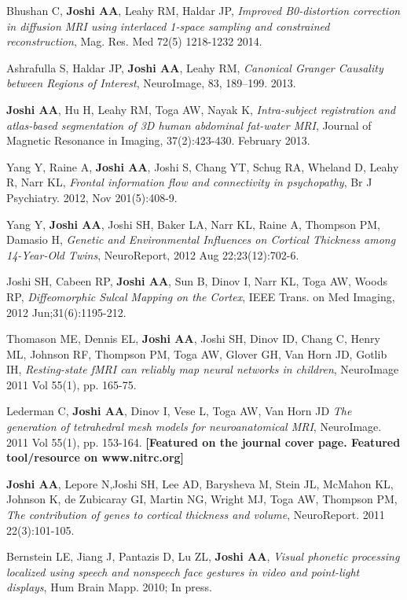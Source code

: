 \documentclass[overlapped,line,letterpaper]{res}
\begin{document}
\begin{resume}
Bhushan C, \textbf{Joshi AA}, Leahy RM, Haldar JP, \textit{Improved B0-distortion correction in diffusion MRI using interlaced 1-space sampling and constrained reconstruction}, Mag. Res. Med 72(5) 1218-1232 2014.

Ashrafulla S, Haldar JP, \textbf{Joshi AA}, Leahy RM, \textit{Canonical Granger Causality between Regions of Interest}, NeuroImage, 83, 189–199. 2013.

\textbf{Joshi AA}, Hu H, Leahy RM, Toga AW, Nayak K, \textit{Intra-subject registration and atlas-based segmentation of 3D human abdominal fat-water MRI}, Journal of Magnetic Resonance in Imaging,  37(2):423-430. February 2013.

Yang Y, Raine A, \textbf{Joshi AA}, Joshi S, Chang YT, Schug RA, Wheland D, Leahy R, Narr KL, \textit{Frontal information flow and connectivity in psychopathy}, Br J Psychiatry. 2012, Nov 201(5):408-9.

Yang Y, \textbf{Joshi AA}, Joshi SH, Baker LA, Narr KL, Raine A, Thompson PM, Damasio H, \textit{Genetic and Environmental Influences on Cortical Thickness among 14-Year-Old Twins}, NeuroReport, 2012 Aug 22;23(12):702-6.

Joshi SH, Cabeen RP, \textbf{Joshi AA}, Sun B, Dinov I, Narr KL, Toga AW, Woods RP, \textit{Diffeomorphic Sulcal Mapping on the Cortex}, IEEE Trans. on Med Imaging,  2012 Jun;31(6):1195-212.

Thomason ME, Dennis EL, \textbf{Joshi AA}, Joshi SH, Dinov ID, Chang C, Henry ML, Johnson RF, Thompson PM, Toga AW, Glover GH, Van Horn JD, Gotlib IH, \textit{Resting-state fMRI can reliably map neural networks in children}, NeuroImage 2011 Vol 55(1), pp. 165-75.

Lederman C, \textbf{Joshi AA}, Dinov I, Vese L, Toga AW, Van Horn JD \textit{The generation of tetrahedral mesh models for neuroanatomical MRI}, NeuroImage. 2011 Vol 55(1), pp. 153-164.  \textbf{[Featured on the journal cover page. Featured tool/resource on www.nitrc.org]}

\textbf{Joshi AA}, Lepore N,Joshi SH, Lee AD, Barysheva M, Stein JL, McMahon KL, Johnson K, de Zubicaray GI, Martin NG, Wright MJ, Toga AW, Thompson PM, \textit{The contribution of genes to cortical thickness and volume}, NeuroReport. 2011  22(3):101-105.

Bernstein LE, Jiang J, Pantazis D, Lu ZL, \textbf{Joshi AA}, \textit{Visual phonetic processing localized using speech and nonspeech face gestures in video and point-light displays}, Hum Brain Mapp. 2010; In press.


\end{resume}
\end{document}
